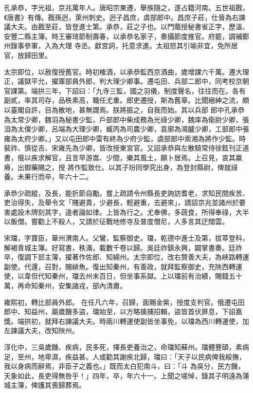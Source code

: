 \begin{pinyinscope}
 孔承恭，字光祖，京兆萬年人。唐昭宗東遷，舉族隨之，遂占籍河南。五世祖戡，《唐書》有傳。戡孫迥，萊州刺史。迥子昌庶，虞部郎中。昌庶子莊，仕晉為右諫議大夫。由戡至莊，皆登進士第。承恭，莊之子也。以門蔭授秘書省正字，歷溫、安豐二縣主簿。時王審琦節制壽春，以承恭名家子，奏攝節度推官。府罷，調補鄭州錄事參軍，入為大理
 寺丞。獻宮詞，托意求進。太祖怒其引喻非宜，免所居官，放歸田里。



 太宗即位，以赦復授舊官。時初榷酒，以承恭監西京酒曲，歲增課六千萬。遷大理正，議獄平允，擢庫部員外郎，判大理少卿事。遷屯田、兵部二郎中，同考校京朝官課第。端拱三年，下詔曰：「九寺三監，國之羽儀，制度聲名，往往而在。各有副貳，率其司存，品秩素高，職任尤重。郎吏遷授，斯為舊章。比聞縉紳之流，頗以臺閣自許，目為散地，甚無謂焉。朕將振之，自我而始。其以兵部
 郎中孔承恭為太常少卿，魏羽為秘書少監，戶部郎中柴成務為光祿少卿，魏庠為衛尉少卿，張洎為太僕少卿，呂端為大理少卿，臧丙為司農少卿，袁廓為鴻臚少卿，工部郎中張雍為太府少卿。」又以屯田郎中雷有終為少府少監，虞部郎中索湘為將作少監。時裴祚、慎從吉、宋雍先為少卿，皆改授東宮官。又詔承恭與左散騎常侍徐鉉刊正道書，俄以疾求解官，且言早游嵩、少間，樂其風土，願卜居焉。上召見，哀其羸瘠，出御藥賜之，授
 將作監致仕。以其子玢同學究出身，為登封縣尉，俾就祿養。未果行而卒，年六十二。



 承恭少疏縱，及長，能折節自勵。嘗上疏請令州縣長吏詢訪耆老，求知民間疾苦、吏治得失，及舉令文「賤避貴，少避長，輕避重，去避來」，請詔京兆並諸州於要害處設木牌刻其字，違者論如律。上皆為行之。尤奉佛，多蔬食，所得奉祿，大半以飯僧。嘗勸上不殺人，又請於征戰地修寺及普度僧尼，人多言其迂闊雲。



 宋璫，字寶臣，華州渭南人。父鸞，監察御史。璫，乾德中進士及第，拔萃登科，解褐青城主簿。好寫書，秩滿，載數千卷以歸。吳廷祚鎮永興，闢掌書奏。廷祚卒，復調下邽主簿，擢著作佐郎、知綿州。太宗即位，改右贊善大夫，為峽路轉運副使。代還，召對，賜緋魚。復出知秦州，有善政，就拜監察御史，充陜西轉運使，以韋但代知秦州，璫去州未百日，但坐事系獄。上以璫前有治績，賜錢五十萬，再命知秦州，安集諸戎，部內清肅。



 雍熙初，轉比部員外郎。
 在任凡六年，召歸，面賜金紫，授度支判官。俄遷屯田郎中、知益州，屬歲饑多盜，璫始至，以方略擒捕招輯，盜皆首伏屏息，下詔嘉獎。端拱初，就拜右諫議大夫。時兩川轉運使副皆坐事免，以璫為西川轉運使，加左諫議大夫，改知陜州。



 淳化中，三吳歲饑、疾病，民多死，擇長吏養治之，命璫知蘇州。璫體豐碩，素病足，至州，地卑濕，疾益甚。人或勸其謝疾北歸，璫曰：「天子以民病俾我綏撫，我以身病而辭焉，非臣子之義也。」既而太白犯南斗，曰：「斗
 為吳分，民方饑，天象如此，長吏得無咎乎！」四年，卒，年六十一。上聞之嗟悼，錄其子明遠為蒲城主簿，俾護其喪歸葬焉。




\end{pinyinscope}
